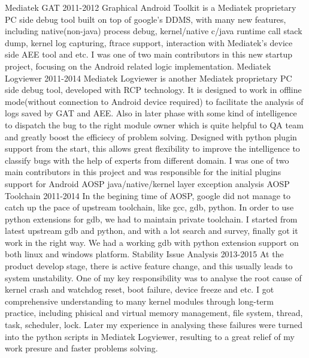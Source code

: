 \begin{cventries}
{\begin{cvsubentries}
        \cvsubentry
          {}
          {Mediatek GAT}
          {2011-2012}
          {Graphical Android Toolkit is a Mediatek proprietary PC side debug tool built on top of google's DDMS, with many new features, including native(non-java) process debug, kernel/native c/java runtime call stack dump, kernel log capturing, ftrace support, interaction with Mediatek's device side AEE tool and etc. I was one of two main contributors in this new startup project, focusing on the Android related logic implementation.}
        \cvsubentry
          {}
          {Mediatek Logviewer}
          {2011-2014}
          {Mediatek Logviewer is another Mediatek proprietary PC side debug tool, developed with RCP technology. It is designed to work in offline mode(without connection to Android device required) to facilitate the analysis of logs saved by GAT and AEE. Also in later phase with some kind of intelligence to dispatch the bug to the right module owner which is quite helpful to QA team and greatly boost the efficiecy of problem solving. Designed with python plugin support from the start, this allows great flexibility to improve the intelligence to classify bugs with the help of experts from different domain. I was one of two main contributors in this project and was responsible for the initial plugins support for Android AOSP java/native/kernel layer exception analysis}
        \cvsubentry
          {}
          {AOSP Toolchain}
          {2011-2014}
          {In the begining time of AOSP, google did not manage to catch up the pace of upstream toolchain, like gcc, gdb, python. In order to use python extensions for gdb, we had to maintain private toolchain. I started from latest upstream gdb and python, and with a lot search and survey, finally got it work in the right way. We had a working gdb with python extension support on both linux and windows platform.}
        \cvsubentry
          {}
          {Stability Issue Analysis}
          {2013-2015}
          {At the product develop stage, there is active feature change, and this usually leads to system unstability. One of my key responsibility was to analyse the root cause of kernel crash and watchdog reset, boot failure, device freeze and etc. I got comprehensive understanding to many kernel modules through long-term practice, including phisical and virtual memory management, file system, thread, task, scheduler, lock. Later my experience in analysing these failures were turned into the python scripts in Mediatek Logviewer, resulting to a great relief of my work presure and faster problems solving.}
        \cvsubentry

\end{cvsubentries}}
\end{cventries}
